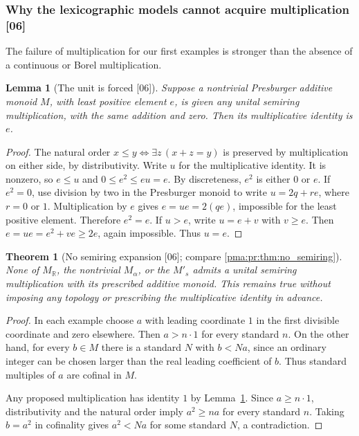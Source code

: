 \documentclass[11pt]{article}
\numberwithin{equation}{section}
\newtheorem{theorem}{Theorem}[section]
\newtheorem{lemma}[lemma]{Lemma}
\theoremstyle{definition}
\theoremstyle{remark}
\newcommand{\R}{\mathbb R}
\newcommand{\src}[1]{\textup{\textsf{\small[#1]}}}
\begin{document}
\subsubsection{Why the lexicographic models cannot acquire multiplication \src{06}}

The failure of multiplication for our first examples is stronger than
the absence of a continuous or Borel multiplication.

\begin{lemma}[The unit is forced \src{06}]
\label{pma:cp:lem:unit}
Suppose a nontrivial Presburger additive monoid $M$, with least positive
element $e$, is given any unital semiring multiplication, with the same
addition and zero. Then its multiplicative identity is $e$.
\end{lemma}

\begin{proof}
The natural order $x\leq y\iff\exists z\,(x+z=y)$ is preserved by
multiplication on either side, by distributivity. Write $u$ for the
multiplicative identity. It is nonzero, so $e\leq u$ and
$0\leq e^2\leq eu=e$. By discreteness, $e^2$ is either $0$ or $e$.
If $e^2=0$, use division by two in the Presburger monoid to write
$u=2q+re$, where $r=0$ or $1$. Multiplication by $e$ gives
$e=ue=2(qe)$, impossible for the least positive element. Therefore
$e^2=e$. If $u>e$, write $u=e+v$ with $v\geq e$. Then
$e=ue=e^2+ve\geq2e$, again impossible. Thus $u=e$.
\end{proof}

\begin{theorem}[No semiring expansion \src{06}; compare \cref{pma:pr:thm:no_semiring}]
\label{pma:cp:thm:nomult}
None of $M_{\R}$, the nontrivial $M_\alpha$, or the $M'_s$ admits a
unital semiring multiplication with its prescribed additive monoid.
This remains true without imposing any topology or prescribing the
multiplicative identity in advance.
\end{theorem}

\begin{proof}
In each example choose $a$ with leading coordinate $1$ in the first
divisible coordinate and zero elsewhere. Then $a>n\cdot1$ for every
standard $n$. On the other hand, for every $b\in M$ there is a standard
$N$ with $b<Na$, since an ordinary integer can be chosen larger than
the real leading coefficient of $b$. Thus standard multiples of $a$
are cofinal in $M$.

Any proposed multiplication has identity $1$ by
Lemma~\ref{pma:cp:lem:unit}. Since $a\geq n\cdot1$, distributivity and the
natural order imply $a^2\geq na$ for every standard $n$. Taking $b=a^2$
in cofinality gives $a^2<Na$ for some standard $N$, a contradiction.
\end{proof}
\end{document}
